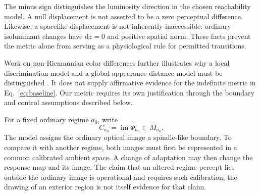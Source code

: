 \documentclass[11pt,letterpaper]{article}
\theoremstyle{plain}
\newcommand{\dd}{\mathrm{d}}
\begin{document}
The minus sign distinguishes the luminosity direction in the chosen reachability model. A null displacement is not asserted to be a zero perceptual difference. Likewise, a spacelike displacement is not inherently inaccessible: ordinary isoluminant changes have $\dd z=0$ and positive spatial norm. These facts prevent the metric alone from serving as a physiological rule for permitted transitions.

Work on non-Riemannian color differences further illustrates why a local discrimination model and a global appearance-distance model must be distinguished \cite{Bujack2022}. It does not supply affirmative evidence for the indefinite metric in Eq.~\eqref{eq:baseline}. Our metric requires its own justification through the boundary and control assumptions described below.

For a fixed ordinary regime $a_0$, write
\begin{equation}
 C_{a_0}=\operatorname{im}\Phi_{a_0}\subset M_{a_0}.
 \label{eq:image}
\end{equation}
The model assigns the ordinary optical image a spindle-like boundary. To compare it with another regime, both images must first be represented in a common calibrated ambient space. A change of adaptation may then change the response map and its image. The claim that an altered-regime percept lies outside the ordinary image is operational and requires such calibration; the drawing of an exterior region is not itself evidence for that claim.
\end{document}
